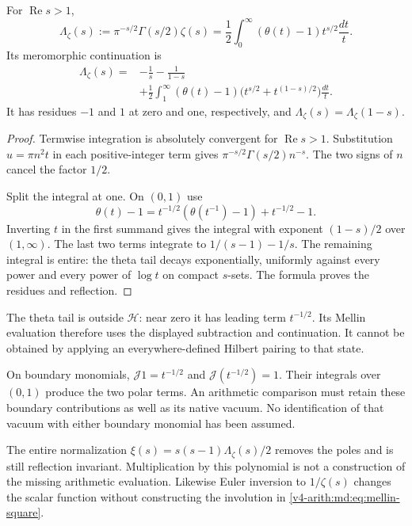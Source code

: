 \begin{proposition}
\label{v4-arith:md:prop:theta-mellin}
For $\operatorname{Re}s>1$,
\[
 \Lambda_\zeta(s)
 :=\pi^{-s/2}\Gamma(s/2)\zeta(s)
 =\frac12\int_0^\infty
       (\theta(t)-1)t^{s/2}\frac{dt}{t}.
\]
Its meromorphic continuation is
\begin{equation}\label{v4-arith:md:eq:polar-mellin}
 \begin{split}
 \Lambda_\zeta(s)
  ={}&-\frac1s-\frac1{1-s}\\
   &+\frac12\int_1^\infty(\theta(t)-1)
       \bigl(t^{s/2}+t^{(1-s)/2}\bigr)\frac{dt}{t}.
 \end{split}
\end{equation}
It has residues $-1$ and $1$ at
zero and one, respectively, and
$\Lambda_\zeta(s)=\Lambda_\zeta(1-s)$.
\end{proposition}

\begin{proof}
Termwise integration is absolutely
convergent for $\operatorname{Re}s>1$.
Substitution $u=\pi n^2t$ in each
positive-integer term gives
$\pi^{-s/2}\Gamma(s/2)n^{-s}$.
The two signs of $n$ cancel the
factor $1/2$.

Split the integral at one.
On $(0,1)$ use
\[
 \theta(t)-1
  =t^{-1/2}(\theta(t^{-1})-1)
       +t^{-1/2}-1.
\]
Inverting $t$ in the first summand
gives the integral with exponent
$(1-s)/2$ over $(1,\infty)$.
The last two terms integrate to
$1/(s-1)-1/s$.
The remaining integral is entire:
the theta tail decays exponentially,
uniformly against every power
and every power of $\log t$
on compact $s$-sets.
The formula proves the residues
and reflection.
\end{proof}

The theta tail is outside
$\mathcal H$: near zero it has
leading term $t^{-1/2}$.
Its Mellin evaluation therefore
uses the displayed subtraction
and continuation.
It cannot be obtained by applying
an everywhere-defined Hilbert
pairing to that state.

On boundary monomials,
$\mathcal J1=t^{-1/2}$ and
$\mathcal J(t^{-1/2})=1$.
Their integrals over $(0,1)$
produce the two polar terms.
An arithmetic comparison must
retain these boundary contributions
as well as its native vacuum.
No identification of that vacuum
with either boundary monomial
has been assumed.

The entire normalization
$\xi(s)=s(s-1)\Lambda_\zeta(s)/2$
removes the poles and is still
reflection invariant.
Multiplication by this polynomial
is not a construction of the
missing arithmetic evaluation.
Likewise Euler inversion to
$1/\zeta(s)$ changes the scalar
function without constructing
the involution in
\eqref{v4-arith:md:eq:mellin-square}.


